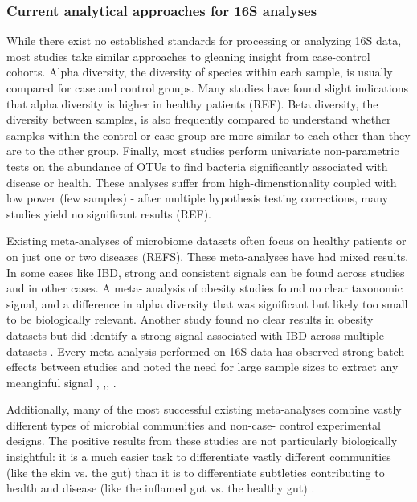 \documentclass[12pt]{article}
\begin{document}
\subsubsection{Current analytical approaches for 16S analyses}
While there exist no established standards for processing or analyzing 
16S data, most studies take similar approaches to gleaning insight 
from case-control cohorts. Alpha diversity, the diversity of species 
within each sample, is usually compared for case and control groups. 
Many studies have found slight indications that alpha diversity is 
higher in healthy patients (REF). Beta diversity, the diversity 
between samples, is also frequently compared to understand whether 
samples within the control or case group are more similar to each 
other than they are to the other group. Finally, most studies perform 
univariate non-parametric tests on the abundance of OTUs to find 
bacteria significantly associated with disease or health. These 
analyses suffer from high-dimenstionality coupled with low power (few 
samples) - after multiple hypothesis testing corrections, many studies 
yield no significant results (REF).

Existing meta-analyses of microbiome datasets often focus on healthy 
patients or on just one or two diseases (REFS). These meta-analyses 
have had mixed results. In some cases like IBD, strong and consistent 
signals can be found across studies and in other cases. A meta-
analysis of obesity studies found no clear taxonomic signal, and a 
difference in alpha diversity that was significant but likely too 
small to be biologically relevant\cite{sze-signal-2016}. Another study 
found no clear results in obesity datasets but did identify a strong 
signal associated with IBD across multiple datasets \cite{walters-ob_meta-2014}. 
Every meta-analysis performed on 16S data has observed 
strong batch effects between studies and noted the need for large 
sample sizes to extract any meanginful signal \cite{sze-signal-2016},
\cite{walters-ob_meta-2014},\cite{knights-supervised-2010},
\cite{lozupone-meta-2013}. 

Additionally, many of the most successful existing meta-analyses 
combine vastly different types of microbial communities and non-case-
control experimental designs. The positive results from these studies 
are not particularly biologically insightful: it is a much easier task 
to differentiate vastly different communities (like the skin vs. the 
gut) than it is to differentiate subtleties contributing to health and 
disease (like the inflamed gut vs. the healthy gut) \cite{knights-supervised-2010}.
\end{document}
